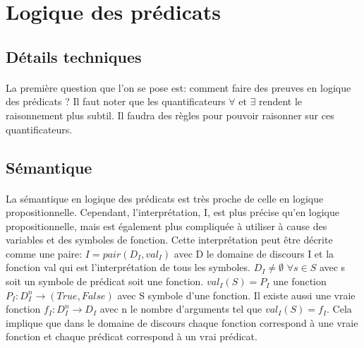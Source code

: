 % 
% 
% 
% 

\chapter{Logique des prédicats}
\section{Détails techniques}
\subsubsection{}
La première question que l'on se pose est: comment faire des preuves en logique des prédicats ? Il faut noter que les quantificateurs $\forall$ et $\exists$ rendent le raisonnement plus subtil. Il faudra des règles pour pouvoir raisonner sur ces quantificateurs.
\section{Sémantique}
\subsubsection{}
La sémantique en logique des prédicats est très proche de celle en logique propositionnelle. Cependant, l'interprétation, I, est plus précise qu'en logique propositionnelle, mais est également plus compliquée à utiliser à cause des variables et des symboles de fonction. Cette interprétation peut être décrite comme une paire: $I = pair(D_{I}, val_{I}) $ avec D le domaine de discours I et la fonction val qui est l'interprétation de tous les symboles. $D_{I} \ne \emptyset $ $ \forall s \in S$ avec s soit un symbole de prédicat soit une fonction. $val_{I}(S) = P_{I}$ une fonction $P_{I}:D_{I}^{n} \rightarrow (True,False)$ avec S symbole d'une fonction. Il existe aussi une vraie fonction $f_{I}:D_{I}^{n} \rightarrow D_{I}$ avec n le nombre d'arguments tel que $val_{I}(S) = f_{I} $. Cela implique que dans le domaine de discours chaque fonction correspond à une vraie fonction et chaque prédicat correspond à un vrai prédicat. 
